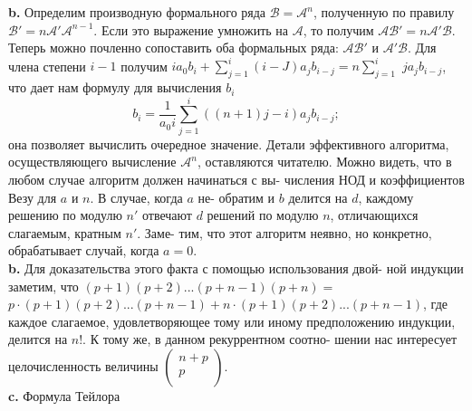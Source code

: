 \textbf{b.} Определим производную формального ряда $\mathcal{B} = \mathcal{A}^n$, полученную по правилу $\mathcal{B}' = n\mathcal{A}'\mathcal{A}^{n-1}$.
Если это выражение умножить на $\mathcal{A}$, то получим $\mathcal{AB}' = n\mathcal{A}'\mathcal{B}$. Теперь можно почленно сопоставить
оба формальных ряда: $\mathcal{AB}'$ и $\mathcal{A}'\mathcal{B}$. Для члена степени $i - 1$ получим
$ia_0 b_i + \sum^i_{j=1} (i-J)a_j b_{i-j} = n\sum^i_{j=1}$ \linebreak $ja_j b_{i-j}$, что дает нам формулу для вычисления $b_i$
\begin{equation*}
b_i = \frac{1}{a_0 i} \sum\limits^i_{j=1}((n + 1)j - i)a_j b_{i-j};
\end{equation*}
она позволяет вычислить очередное значение. Детали эффективного алгоритма,
осуществляющего вычисление $\mathcal{A}^n$, оставляются читателю.
\newpage
\noindent Можно видеть, что в любом случае алгоритм должен начинаться с вы-\linebreak
числения НОД и коэффициентов Везу для $a$ и $n$. В случае, когда $a$ не­-\linebreak
обратим и $b$ делится на $d$, каждому решению по модулю $n'$ отвечают\linebreak
$d$ решений по модулю $n$, отличающихся слагаемым, кратным $n'$. Заме­-\linebreak
тим, что этот алгоритм неявно, но конкретно, обрабатывает случай,\linebreak
когда $a=0$.\newline
\\
\hspace*{15pt}\textbf{b.} Для доказательства этого факта с помощью использования двой­-\linebreak
ной индукции заметим, что $(p+1)(p+2)...(p+n-1)(p+n)=$\linebreak
$p\cdot(p+1)(p+2)...(p+n-1)+n\cdot(p+1)(p+2)...(p+n-1)$, где\linebreak
каждое слагаемое, удовлетворяющее тому или иному предположению\linebreak
индукции, делится на $n!$. К тому же, в данном рекуррентном соотно-\linebreak
шении нас интересует целочисленность величины $\left(\begin{smallmatrix}
n+p\\ p\\
\end{smallmatrix}\right).$\newline
\\
\hspace*{15pt}\textbf{c.} Формула Тейлора
